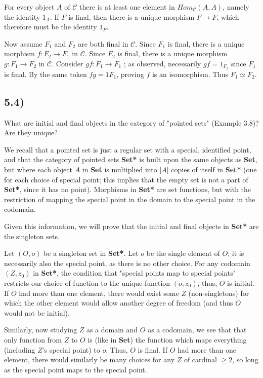 \documentclass[12pt, letterpaper, twoside]{report}
\begin{document}
For every object $A$ of $\mathcal{C}$ there is at least one element in $Hom_{\mathcal{C}} (A, A)$, namely the identity $1_A$. If $F$ is final, then there is a unique morphism $F \to F$, which therefore must be the identity $1_F$.

Now assume $F_1$ and $F_2$ are both final in $\mathcal{C}$. Since $F_1$ is final, there is a unique morphism $f : F_2 \to F_1$ in $\mathcal{C}$. Since $F_2$ is final, there is a unique morphism $g : F_1 \to F_2$ in $\mathcal{C}$. Consider $gf : F_1 \to F_1$ ; as observed, necessarily $gf = 1_{F_2}$
since $F_1$ is final. By the same token $fg = 1{F_1}$, proving $f$ is an isomorphism. Thus $F_1 \simeq F_2$.



\subsection*{5.4)}

What are initial and final objects in the category of "pointed sets" (Example 3.8)? Are they unique?

We recall that a pointed set is just a regular set with a special, identified point, and that the category of pointed sets \textbf{Set*} is built upon the same objects as \textbf{Set}, but where each object $A$ in \textbf{Set} is multiplied into $|A|$ copies of itself in \textbf{Set*} (one for each choice of special point; this implies that the empty set is not a part of \textbf{Set*}, since it has no point). Morphisms in \textbf{Set*} are set functions, but with the restriction of mapping the special point in the domain to the special point in the codomain.

Given this information, we will prove that the initial and final objects in \textbf{Set*} are the singleton sets.

Let $(O, o)$ be a singleton set in \textbf{Set*}. Let $o$ be the single element of $O$; it is necessarily also the special point, as there is no other choice. For any codomain $(Z, z_0)$ in \textbf{Set*}, the condition that "special points map to special points" restricts our choice of function to the unique function ${(o, z_0)}$, thus, $O$ is initial. If $O$ had more than one element, there would exist some $Z$ (non-singletons) for which the other element would allow another degree of freedom (and thus $O$ would not be initial).

Similarly, now studying $Z$ as a domain and $O$ as a codomain, we see that that only function from $Z$ to $O$ is (like in \textbf{Set}) the function which maps everything (including $Z$'s special point) to $o$. Thus, $O$ is final. If $O$ had more than one element, there would similarly be many choices for any $Z$ of cardinal $\geq 2$, so long as the special point maps to the special point.
\end{document}
